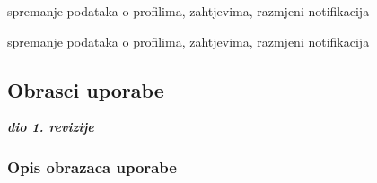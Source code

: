 \begin{packed_enum}
	\item  {}
	\begin{packed_enum}
		
		\item spremanje podataka o profilima, zahtjevima, razmjeni notifikacija
		
	\end{packed_enum}
	
	\item  {}
	\begin{packed_enum}
		
		\item spremanje podataka o profilima, zahtjevima, razmjeni notifikacija
		
	\end{packed_enum}
\end{packed_enum}

\eject 



\subsection{Obrasci uporabe}

\textbf{\textit{dio 1. revizije}}

\subsubsection{Opis obrazaca uporabe}

